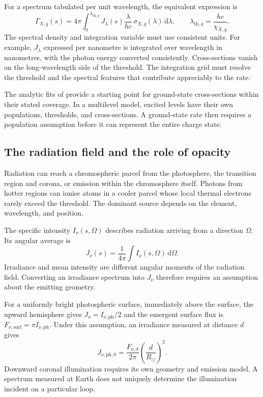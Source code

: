 For a spectrum tabulated per unit wavelength, the equivalent expression is
\begin{equation}
 \Gamma_{X,q}(s)=4\pi\int_0^{\lambda_{\mathrm{th},q}}
 J_\lambda(s)\frac{\lambda}{hc}\,\sigma_{X,q}(\lambda)\,\mathrm{d}\lambda,
 \qquad \lambda_{\mathrm{th},q}=\frac{hc}{\chi_{X,q}}.
 \label{eq:ion-photo-wavelength}
\end{equation}
The spectral density and integration variable must use consistent units.
For example, $J_\lambda$ expressed per nanometre is integrated over
wavelength in nanometres, with the photon energy converted consistently.
Cross-sections vanish on the long-wavelength side of the threshold.
The integration grid must resolve the threshold and the spectral features
that contribute appreciably to the rate.

The analytic fits of \citet{Verner1996} provide a starting point for
ground-state cross-sections within their stated coverage. In a multilevel
model, excited levels have their own populations, thresholds, and
cross-sections. A ground-state rate then requires a population assumption
before it can represent the entire charge state.

\subsection{The radiation field and the role of opacity}

Radiation can reach a chromospheric parcel from the photosphere, the
transition region and corona, or emission within the chromosphere itself.
Photons from hotter regions can ionise atoms in a cooler parcel whose
local thermal electrons rarely exceed the threshold. The dominant source
depends on the element, wavelength, and position.

The specific intensity $I_\nu(s,\Omega)$ describes radiation arriving from a
direction $\Omega$. Its angular average is
\begin{equation}
 J_\nu(s)=\frac{1}{4\pi}\int I_\nu(s,\Omega)\,\mathrm{d}\Omega.
 \label{eq:ion-mean-intensity}
\end{equation}
Irradiance and mean intensity are different angular moments of the radiation
field. Converting an irradiance spectrum into $J_\nu$ therefore requires an
assumption about the emitting geometry.

For a uniformly bright photospheric surface, immediately above the surface,
the upward hemisphere gives $J_\nu=I_{\nu,\mathrm{ph}}/2$ and the emergent
surface flux is $F_{\nu,\mathrm{surf}}=\pi I_{\nu,\mathrm{ph}}$. Under this
assumption, an irradiance measured at distance $d$ gives
\begin{equation}
 J_{\nu,\mathrm{ph},0}
 =\frac{F_{\nu,d}}{2\pi}\left(\frac{d}{R_\odot}\right)^2.
 \label{eq:ion-irradiance-conversion}
\end{equation}
Downward coronal illumination requires its own geometry and emission model.
A spectrum measured at Earth does not uniquely determine the illumination
incident on a particular loop.

